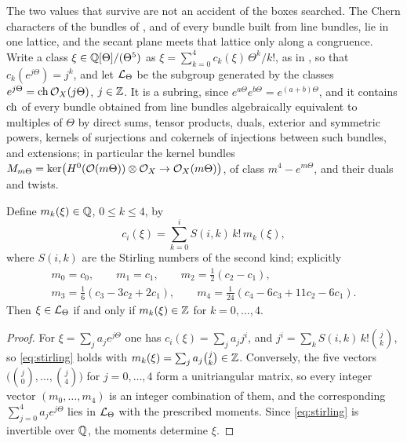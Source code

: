 The two values that survive are not an accident of the boxes searched. The
Chern characters of the bundles of , and of every bundle
built from line bundles, lie in one lattice, and the secant plane meets that
lattice only along a congruence. Write a class $\xi\in\mathbb{Q}[\Theta]/(\Theta^{5})$
as $\xi=\sum_{k=0}^{4}c_{k}(\xi)\,\Theta^{k}/k!$, as in
, so that $c_{k}(e^{j\Theta})=j^{k}$, and let
$\mathcal{L}_{\Theta}$ be the subgroup generated by the classes
$e^{j\Theta}=\operatorname{ch}\mathcal{O}_{X}(j\Theta)$, $j\in\mathbb{Z}$. It is a subring, since
$e^{a\Theta}e^{b\Theta}=e^{(a+b)\Theta}$, and it contains $\operatorname{ch}$ of every
bundle obtained from line bundles algebraically equivalent to multiples of
$\Theta$ by direct sums, tensor products, duals, exterior and symmetric
powers, kernels of surjections and cokernels of injections between such
bundles, and extensions;
in particular the kernel bundles
$M_{m\Theta}=\ker\bigl(H^{0}(\mathcal{O}(m\Theta))\otimes\mathcal{O}_{X}\to\mathcal{O}_{X}(m\Theta)\bigr)$,
of class $m^{4}-e^{m\Theta}$, and their duals and twists.

\begin{lemma}\label{lem:binomialmoments}
Define $m_{k}(\xi)\in\mathbb{Q}$, $0\le k\le4$, by
\begin{equation}\label{eq:stirling}
  c_{i}(\xi)=\sum_{k=0}^{i}S(i,k)\,k!\,m_{k}(\xi),
\end{equation}
where $S(i,k)$ are the Stirling numbers of the second kind; explicitly
\begin{gather*}
  m_{0}=c_{0},\qquad m_{1}=c_{1},\qquad m_{2}=\tfrac12(c_{2}-c_{1}),\\
  m_{3}=\tfrac16(c_{3}-3c_{2}+2c_{1}),\qquad
  m_{4}=\tfrac1{24}(c_{4}-6c_{3}+11c_{2}-6c_{1}).
\end{gather*}
Then $\xi\in\mathcal{L}_{\Theta}$ if and only if $m_{k}(\xi)\in\mathbb{Z}$ for $k=0,\dots,4$.
\end{lemma}

\begin{proof}
For $\xi=\sum_{j}a_{j}e^{j\Theta}$ one has $c_{i}(\xi)=\sum_{j}a_{j}j^{i}$,
and $j^{i}=\sum_{k}S(i,k)\,k!\binom{j}{k}$, so \eqref{eq:stirling} holds
with $m_{k}(\xi)=\sum_{j}a_{j}\binom{j}{k}\in\mathbb{Z}$. Conversely, the five
vectors $\bigl(\binom{j}{0},\dots,\binom{j}{4}\bigr)$ for $j=0,\dots,4$
form a unitriangular matrix, so every integer vector $(m_{0},\dots,m_{4})$
is an integer combination of them, and the corresponding
$\sum_{j=0}^{4}a_{j}e^{j\Theta}$ lies in $\mathcal{L}_{\Theta}$ with the prescribed
moments. Since \eqref{eq:stirling} is invertible over $\mathbb{Q}$, the moments
determine $\xi$.
\end{proof}

